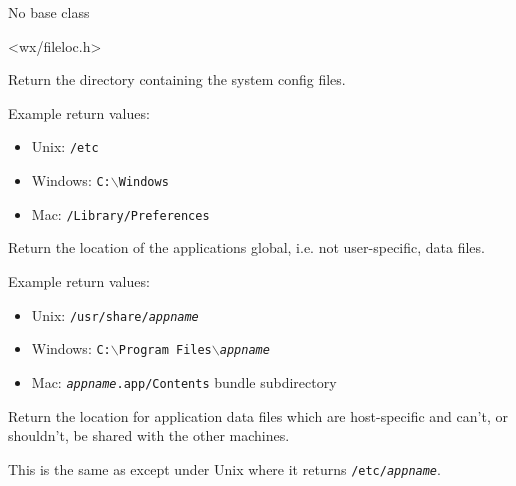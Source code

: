 
No base class


<wx/fileloc.h>




\label{wxfilelocatorgetconfigdir}


Return the directory containing the system config files.

Example return values:
\begin{itemize}
    \item Unix: \texttt{/etc}
    \item Windows: \texttt{C:$\backslash$Windows}
    \item Mac: \texttt{/Library/Preferences}
\end{itemize}




\label{wxfilelocatorgetdatadir}


Return the location of the applications global, i.e. not user-specific,
data files.

Example return values:
\begin{itemize}
    \item Unix: \texttt{/usr/share/\textit{appname}}
    \item Windows: \texttt{C:$\backslash$Program Files$\backslash$\textit{appname}}
    \item Mac: \texttt{\textit{appname}.app/Contents} bundle subdirectory
\end{itemize}




\label{wxfilelocatorgetlocaldatadir}


Return the location for application data files which are host-specific and
can't, or shouldn't, be shared with the other machines.

This is the same as  except
under Unix where it returns \texttt{/etc/\textit{appname}}.


